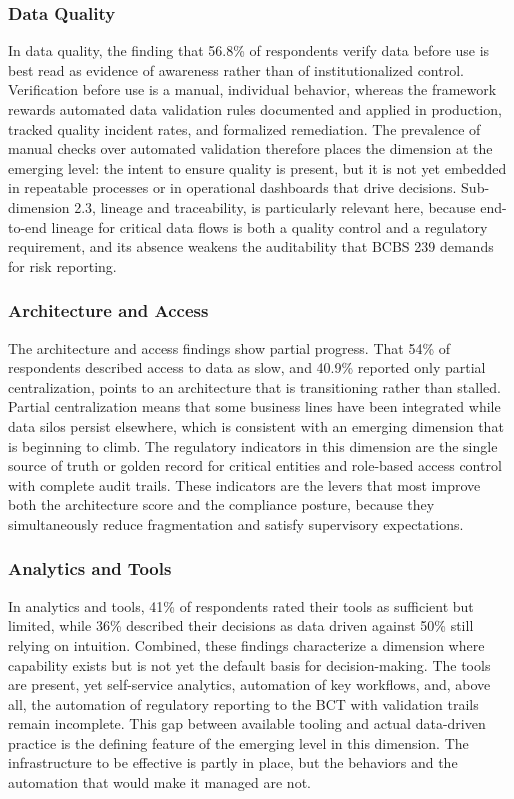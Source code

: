 \subsubsection{Data Quality}

In data quality, the finding that 56.8\% of respondents verify data before use is best read as evidence of awareness rather than of institutionalized control. Verification before use is a manual, individual behavior, whereas the framework rewards automated data validation rules documented and applied in production, tracked quality incident rates, and formalized remediation. The prevalence of manual checks over automated validation therefore places the dimension at the emerging level: the intent to ensure quality is present, but it is not yet embedded in repeatable processes or in operational dashboards that drive decisions. Sub-dimension 2.3, lineage and traceability, is particularly relevant here, because end-to-end lineage for critical data flows is both a quality control and a regulatory requirement, and its absence weakens the auditability that BCBS 239 demands for risk reporting.

\subsubsection{Architecture and Access}

The architecture and access findings show partial progress. That 54\% of respondents described access to data as slow, and 40.9\% reported only partial centralization, points to an architecture that is transitioning rather than stalled. Partial centralization means that some business lines have been integrated while data silos persist elsewhere, which is consistent with an emerging dimension that is beginning to climb. The regulatory indicators in this dimension are the single source of truth or golden record for critical entities and role-based access control with complete audit trails. These indicators are the levers that most improve both the architecture score and the compliance posture, because they simultaneously reduce fragmentation and satisfy supervisory expectations.

\subsubsection{Analytics and Tools}

In analytics and tools, 41\% of respondents rated their tools as sufficient but limited, while 36\% described their decisions as data driven against 50\% still relying on intuition. Combined, these findings characterize a dimension where capability exists but is not yet the default basis for decision-making. The tools are present, yet self-service analytics, automation of key workflows, and, above all, the automation of regulatory reporting to the BCT with validation trails remain incomplete. This gap between available tooling and actual data-driven practice is the defining feature of the emerging level in this dimension. The infrastructure to be effective is partly in place, but the behaviors and the automation that would make it managed are not.

